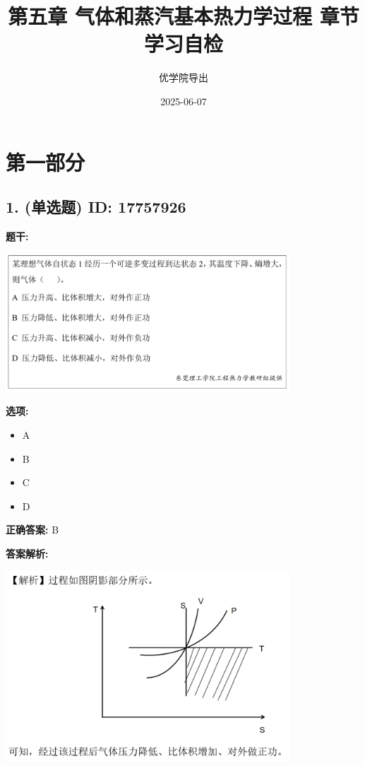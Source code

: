 \documentclass[12pt]{article}
\title{第五章 气体和蒸汽基本热力学过程 章节学习自检}
\author{优学院导出}
\date{2025-06-07}
\begin{document}
\maketitle

\section*{第一部分}
\hrulefill

\subsection*{1. (单选题) \small ID: 17757926}

\textbf{题干:}


\begin{center}\includegraphics[width=0.8\textwidth, height=0.25\textheight, keepaspectratio]{question_1_17757926/title_img_1.png}\end{center}

\textbf{选项:}
\begin{itemize}[leftmargin=*]
  \item A

  \item B

  \item C

  \item D

\end{itemize}

\textbf{正确答案:}
B

\textbf{答案解析:}


\begin{center}\includegraphics[width=0.8\textwidth, height=0.25\textheight, keepaspectratio]{question_1_17757926/correct_replay_img_1.png}\end{center}
\end{document}
